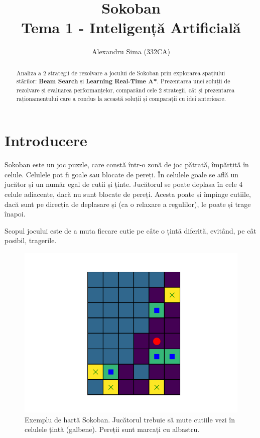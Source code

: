 \documentclass{article}
\title{{\huge Sokoban}\\Tema 1 - Inteligență Artificială}
\author{Alexandru Sima (332CA)}
\begin{document}
\maketitle
\begin{abstract}
    Analiza a 2 strategii de rezolvare a jocului de Sokoban prin explorarea 
    spațiului stărilor: \textbf{Beam Search} și \textbf{Learning Real-Time A*}. 
    Prezentarea unei soluții de rezolvare și evaluarea performanțelor, comparând
    cele 2 strategii, cât și prezentarea raționamentului care a condus la 
    această soluții și comparații cu idei anterioare.
\end{abstract}

\pagestyle{fancy}

\newpage
\tableofcontents

\newpage
\section{Introducere}
Sokoban este un joc puzzle, care constă într-o zonă de joc pătrată, împărțită în
celule. Celulele pot fi goale sau blocate de pereți. În celulele goale se află 
un jucător și un număr egal de cutii și ținte. Jucătorul se poate deplasa în 
cele 4 celule adiacente, dacă nu sunt blocate de pereți. Acesta poate și împinge
cutiile, dacă sunt pe direcția de deplasare și (ca o relaxare a regulilor), le 
poate și trage înapoi.

Scopul jocului este de a muta fiecare cutie pe câte o țintă diferită, evitând, 
pe cât posibil, tragerile.

\begin{figure}[ht]
    \begin{center}
        \includegraphics[scale=0.7]{hard_map1.png}
    \end{center}
    \caption{Exemplu de hartă Sokoban. Jucătorul trebuie să mute cutiile vezi 
    în celulele țintă (galbene). Pereții sunt marcați cu albastru.}
    \label{fig:sokoban}
\end{figure}
\end{document}
